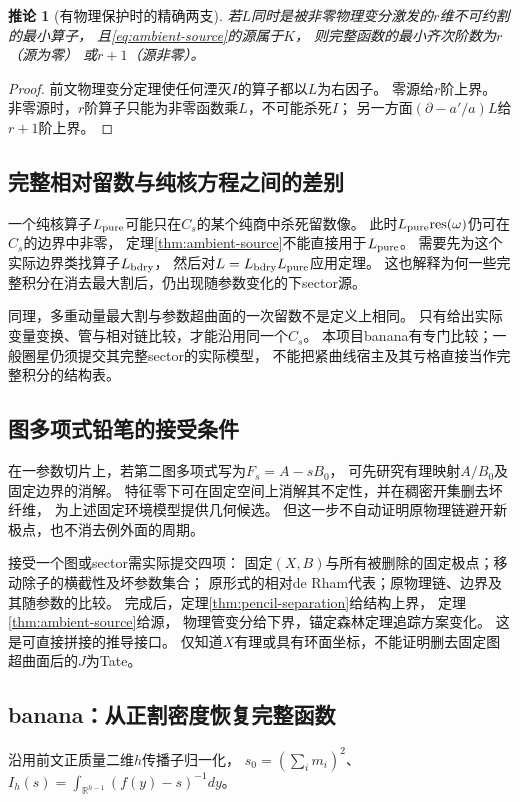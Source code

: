 \documentclass[11pt,a4paper]{ctexart}
\theoremstyle{cnplain}\newtheorem{theorem}{定理}[section]
\newtheorem{corollary}[theorem]{推论}
\theoremstyle{definition}\newtheorem{definition}[theorem]{定义}
\theoremstyle{remark}\newtheorem{remark}[theorem]{注}
\begin{document}
\begin{corollary}[有物理保护时的精确两支]\label{cor:ambient-exact}
若$L$同时是被非零物理变分激发的$r$维不可约割的最小算子，
且\eqref{eq:ambient-source}的源属于$K$，
则完整函数的最小齐次阶数为$r$（源为零）
或$r+1$（源非零）。
\end{corollary}
\begin{proof}
前文物理变分定理使任何湮灭$I$的算子都以$L$为右因子。
零源给$r$阶上界。
非零源时，$r$阶算子只能为非零函数乘$L$，不可能杀死$I$；
另一方面$(\partial-a'/a)L$给$r+1$阶上界。
\end{proof}

\subsection{完整相对留数与纯核方程之间的差别}
一个纯核算子$L_{\rm pure}$可能只在$C_s$的某个纯商中杀死留数像。
此时$L_{\rm pure}\mathrm{res}(\omega)$仍可在$C_s$的边界中非零，
定理\ref{thm:ambient-source}不能直接用于$L_{\rm pure}$。
需要先为这个实际边界类找算子$L_{\rm bdry}$，
然后对$L=L_{\rm bdry}L_{\rm pure}$应用定理。
这也解释为何一些完整积分在消去最大割后，仍出现随参数变化的下sector源。

同理，多重动量最大割与参数超曲面的一次留数不是定义上相同。
只有给出实际变量变换、管与相对链比较，才能沿用同一个$C_s$。
本项目banana有专门比较；一般圈星仍须提交其完整sector的实际模型，
不能把紧曲线宿主及其亏格直接当作完整积分的结构表。

\subsection{图多项式铅笔的接受条件}
在一参数切片上，若第二图多项式写为$F_s=A-sB_0$，
可先研究有理映射$A/B_0$及固定边界的消解。
特征零下可在固定空间上消解其不定性，并在稠密开集删去坏纤维，
为上述固定环境模型提供几何候选。
但这一步不自动证明原物理链避开新极点，也不消去例外面的周期。

接受一个图或sector需实际提交四项：
固定$(X,B)$与所有被删除的固定极点；移动除子的横截性及坏参数集合；
原形式的相对de Rham代表；原物理链、边界及其随参数的比较。
完成后，定理\ref{thm:pencil-separation}给结构上界，
定理\ref{thm:ambient-source}给源，
物理管变分给下界，锚定森林定理追踪方案变化。
这是可直接拼接的推导接口。
仅知道$X$有理或具有环面坐标，不能证明删去固定图超曲面后的$J$为Tate。

\subsection{banana：从正割密度恢复完整函数}
沿用前文正质量二维$h$传播子归一化，
$s_0=(\sum_i m_i)^2$、$I_h(s)=\int_{\mathbb R^{h-1}}(f(y)-s)^{-1}dy$。
\end{document}

